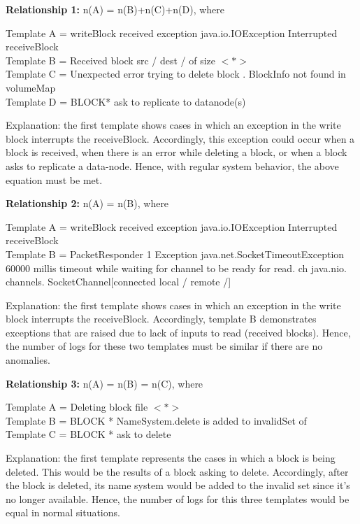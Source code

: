 \documentclass[12pt,a4paper]{article}
\begin{document}
	\vspace{0.2cm}
	\noindent \textbf{Relationship 1: }n(A) = n(B)+n(C)+n(D), where
	
	\noindent Template A = writeBlock received exception java.io.IOException Interrupted receiveBlock\\
	Template B = Received block src / dest / of size $<*>$\\
	Template C = Unexpected error trying to delete block . BlockInfo not found in volumeMap\\
	Template D = BLOCK* ask to replicate to datanode(s)
	\vspace{0.1cm}
	
	\noindent Explanation: the first template shows cases in which an exception in the write block interrupts the receiveBlock. Accordingly, this exception could occur when a block is received, when there is an error while deleting a block, or when a block asks to replicate a data-node. Hence, with regular system behavior, the above equation must be met.
	
	\vspace{0.2cm}
	

	\noindent \textbf{Relationship 2: }n(A) = n(B), where
	
	\noindent Template A = writeBlock received exception java.io.IOException Interrupted receiveBlock\\
	Template B = PacketResponder 1 Exception java.net.SocketTimeoutException 60000 millis timeout while waiting for channel to be ready for read. ch java.nio. channels. SocketChannel[connected local / remote /]
	\vspace{0.1cm}
	
	\noindent Explanation: the first template shows cases in which an exception in the write block interrupts the receiveBlock. Accordingly, template B demonstrates exceptions that are raised due to lack of inputs to read (received blocks). Hence, the number of logs for these two templates must be similar if there are no anomalies.
	
	\vspace{0.2cm}
	\noindent \textbf{Relationship 3: }n(A) = n(B) = n(C), where
	
	\noindent Template A = Deleting block file $<*>$\\
	Template B = BLOCK * NameSystem.delete is added to invalidSet of\\
	Template C = BLOCK * ask to delete
	\vspace{0.1cm}

	\noindent Explanation: the first template represents the cases in which a block is being deleted. This would be the results of a block asking to delete. Accordingly, after the block is deleted, its name system would be added to the invalid set since it's no longer available. Hence, the number of logs for this three templates would be equal in normal situations.
	
\end{document}
